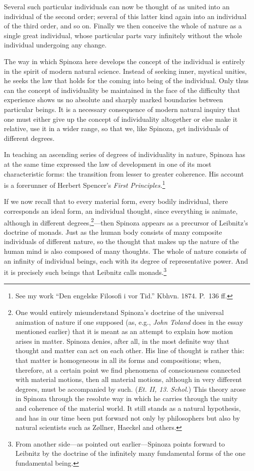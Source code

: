 \documentclass[12pt]{book}
\newcommand{\opage}[1]{\marginnote{\footnotesize\textit{[#1]}}}
\begin{document}
Several such particular individuals can now be thought of as united into an individual
of the second order; several of this latter kind again into an individual of the third
order, and so on. Finally we then conceive the whole of nature as a single great
individual, whose particular parts vary infinitely without the whole individual
undergoing any change.

The way in which Spinoza here develops the concept of the individual is entirely in the
spirit of modern natural science. Instead of seeking inner, mystical unities, he seeks
the law that holds for the coming into being of the individual. Only thus can the
concept of individuality be maintained in the face of the difficulty that experience
shows us no absolute and sharply marked boundaries between particular beings. It is a
necessary consequence of modern natural inquiry that one must either give up the concept
of individuality altogether or else make it relative, \opage{93}use it in a wider
range, so that we, like Spinoza, get individuals of different degrees.

In teaching an ascending series of degrees of individuality in nature, Spinoza has at
the same time expressed the law of development in one of its most characteristic forms:
the transition from lesser to greater coherence. His account is a forerunner of Herbert
Spencer's \textit{First Principles.}\footnote{See my work ``Den engelske Filosofi i vor
Tid.'' Kbhvn. 1874. P.~136 ff.}

If we now recall that to every material form, every bodily individual, there
corresponds an ideal form, an individual thought, since everything is animate, although
in different degrees,\footnote{One would entirely misunderstand Spinoza's doctrine of the
universal animation of nature if one supposed (as, e.g., \emph{John Toland} does in the
essay mentioned earlier) that it is meant as an attempt to explain how motion arises in
matter. Spinoza denies, after all, in the most definite way that thought and matter can
act on each other. His line of thought is rather this: that matter is homogeneous in all
its forms and compositions; when, therefore, at a certain point we find phenomena of
consciousness connected with material motions, then all material motions, although in
very different degrees, must be accompanied by such. (\textit{Et. II, 13. Schol.}) This
theory arose in Spinoza through the resolute way in which he carries through the unity
and coherence of the material world. It still stands as a natural hypothesis, and has
in our time been put forward not only by philosophers but also by natural scientists
such as Zøllner, Haeckel and others.}---then Spinoza appears as a precursor of
Leibnitz's doctrine of monads. Just as the human body consists of many composite
individuals of different nature, so the thought that makes up the nature of the human
mind is also composed of many thoughts. \opage{94}The whole of nature consists of an
infinity of individual beings, each with its degree of representative power. And it is
precisely such beings that Leibnitz calls monads.\footnote{From another side---as
pointed out earlier---Spinoza points forward to Leibnitz by the doctrine of the
infinitely many fundamental forms of the one fundamental being.}
\end{document}
